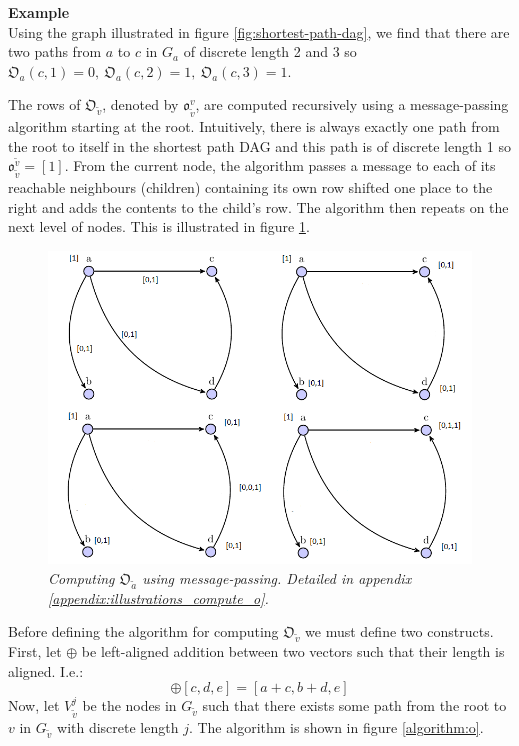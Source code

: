 \documentclass{article}
\begin{document}
\textbf{Example}\\
Using the graph illustrated in figure \ref{fig:shortest-path-dag}, we find that there are two paths from $a$ to $c$ in $G_{a}$ of discrete length 2 and 3 so $\mathfrak{O}_{a}(c,1)=0,\ \mathfrak{O}_{a}(c,2)=1,\ \mathfrak{O}_{a}(c,3)=1$.

The rows of $\mathfrak{O}_{\tilde{v}}$, denoted by $\mathfrak{o}_{\tilde{v}}^v$, are computed recursively using a message-passing algorithm starting at the root. Intuitively, there is always exactly one path from the root to itself in the shortest path DAG and this path is of discrete length 1 so $\mathfrak{o}_{\tilde{v}}^{\tilde{v}}=[1]$. From the current node, the algorithm passes a message to each of its reachable neighbours (children) containing its own row shifted one place to the right and adds the contents to the child's row. The algorithm then repeats on the next level of nodes. This is illustrated in figure \ref{fig:compute_o}.


\begin{figure}[H]
	\includegraphics[width=12cm]{compute_o}
	\caption{\textit{Computing $\mathfrak{O}_{\tilde{a}}$ using message-passing. Detailed in appendix \ref{appendix:illustrations_compute_o}.}}
	\label{fig:compute_o}
\end{figure}


Before defining the algorithm for computing $\mathfrak{O}_{\tilde{v}}$ we must define two constructs. First, let $\oplus$ be left-aligned addition between two vectors such that their length is aligned. I.e.:
\begin{equation}
[a, b] \oplus [c, d, e] = [a + c, b + d, e]
\end{equation}
Now, let $V_{\tilde{v}}^j$ be the nodes in $G_{\tilde{v}}$ such that there exists some path from the root to $v$ in $G_{\tilde{v}}$ with discrete length $j$. The algorithm is shown in figure \ref{algorithm:o}.
\end{document}
